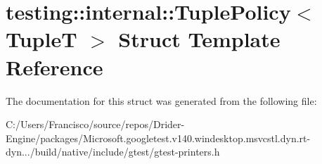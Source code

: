 \hypertarget{structtesting_1_1internal_1_1_tuple_policy}{}\section{testing\+:\+:internal\+:\+:Tuple\+Policy$<$ TupleT $>$ Struct Template Reference}
\label{structtesting_1_1internal_1_1_tuple_policy}


The documentation for this struct was generated from the following file\+:\begin{DoxyCompactItemize}
\item 
C\+:/\+Users/\+Francisco/source/repos/\+Drider-\/\+Engine/packages/\+Microsoft.\+googletest.\+v140.\+windesktop.\+msvcstl.\+dyn.\+rt-\/dyn.../build/native/include/gtest/gtest-\/printers.\+h\end{DoxyCompactItemize}
